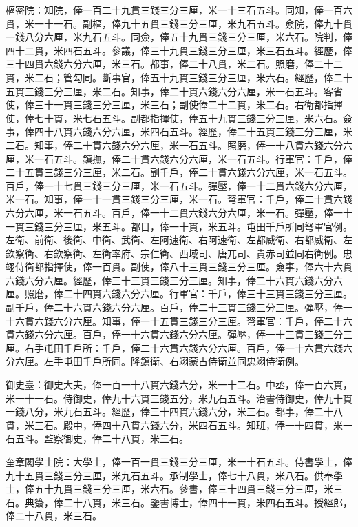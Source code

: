 \begin{pinyinscope}
 樞密院：知院，俸一百二十九貫三錢三分三厘，米一十三石五斗。同知，俸一百六貫，米一十一石。副樞，俸九十五貫三錢三分三厘，米九石五斗。僉院，俸九十貫一錢八分六厘，米九石五斗。同僉，俸五十九貫三錢三分三厘，米六石。院判，俸四十二貫，米四石五斗。參議，俸三十九貫三錢三分三厘，米三石五斗。經歷，俸三十四貫六錢六分六厘，米三石。都事，俸二十八貫，米二石。照磨，俸二十二貫，米二石；管勾同。斷事官，俸五十九貫三錢三分三厘，米六石。經歷，俸二十五貫三錢三分三厘，米二石。知事，俸二十貫六錢六分六厘，米一石五斗。客省使，俸三十一貫三錢三分三厘，米三石；副使俸二十二貫，米二石。右衛都指揮使，俸七十貫，米七石五斗。副都指揮使，俸五十九貫三錢三分三厘，米六石。僉事，俸四十八貫六錢六分六厘，米四石五斗。經歷，俸二十五貫三錢三分三厘，米二石。知事，俸二十貫六錢六分六厘，米一石五斗。照磨，俸一十八貫六錢六分六厘，米一石五斗。鎮撫，俸二十貫六錢六分六厘，米一石五斗。行軍官：千戶，俸二十五貫三錢三分三厘，米二石。副千戶，俸二十貫六錢六分六厘，米一石五斗。百戶，俸一十七貫三錢三分三厘，米一石五斗。彈壓，俸一十二貫六錢六分六厘，米一石。知事，俸一十一貫三錢三分三厘，米一石。弩軍官：千戶，俸二十貫六錢六分六厘，米一石五斗。百戶，俸一十二貫六錢六分六厘，米一石。彈壓，俸一十一貫三錢三分三厘，米五斗。都目，俸一十貫，米五斗。屯田千戶所同弩軍官例。左衛、前衛、後衛、中衛、武衛、左阿速衛、右阿速衛、左都威衛、右都威衛、左欽察衛、右欽察衛、左衛率府、宗仁衛、西域司、唐兀司、貴赤司並同右衛例。忠翊侍衛都指揮使，俸一百貫。副使，俸八十三貫三錢三分三厘。僉事，俸六十六貫六錢六分六厘。經歷，俸三十三貫三錢三分三厘。知事，俸二十六貫六錢六分六厘。照磨，俸二十四貫六錢六分六厘。行軍官：千戶，俸三十三貫三錢三分三厘。副千戶，俸二十六貫六錢六分六厘。百戶，俸二十三貫三錢三分三厘。彈壓，俸一十六貫六錢六分六厘。知事，俸一十五貫三錢三分三厘。弩軍官：千戶，俸二十六貫六錢六分六厘。百戶，俸一十六貫六錢六分六厘。彈壓，俸一十三貫三錢三分三厘。右手屯田千戶所：千戶，俸二十六貫六錢六分六厘。百戶，俸一十六貫六錢六分六厘。左手屯田千戶所同。隆鎮衛、右翊蒙古侍衛並同忠翊侍衛例。



 御史臺：御史大夫，俸一百一十八貫六錢六分，米一十二石。中丞，俸一百六貫，米一十一石。侍御史，俸九十六貫三錢五分，米九石五斗。治書侍御史，俸九十貫一錢八分，米九石五斗。經歷，俸三十四貫六錢六分，米三石。都事，俸二十八貫，米三石。殿中，俸四十八貫六錢六分，米四石五斗。知班，俸一十四貫，米一石五斗。監察御史，俸二十八貫，米三石。



 奎章閣學士院：大學士，俸一百一貫三錢三分三厘，米一十石五斗。侍書學士，俸九十五貫三錢三分三厘，米九石五斗。承制學士，俸七十八貫，米八石。供奉學士，俸五十九貫三錢三分三厘，米六石。參書，俸三十四貫三錢三分三厘，米三石。典簽，俸二十八貫，米三石。鑒書博士，俸四十一貫，米四石五斗。授經郎，俸二十八貫，米三石。




\end{pinyinscope}
